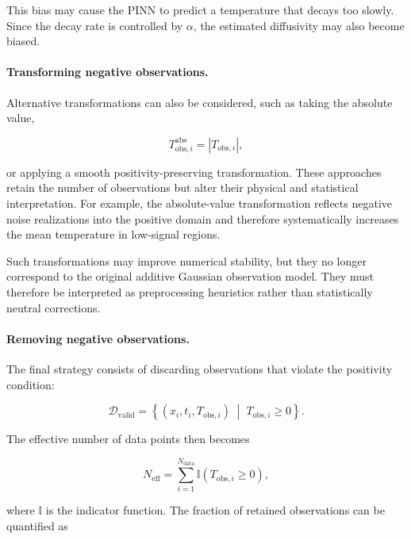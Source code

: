 This bias may cause the PINN to predict a temperature that decays too slowly. Since the decay rate is controlled by $\alpha$, the estimated diffusivity may also become biased.

\paragraph{Transforming negative observations.}

Alternative transformations can also be considered, such as taking the absolute value,

\begin{equation}
T_{\mathrm{obs},i}^{\mathrm{abs}}
=
\left|T_{\mathrm{obs},i}\right|,
\end{equation}

or applying a smooth positivity-preserving transformation. These approaches retain the number of observations but alter their physical and statistical interpretation. For example, the absolute-value transformation reflects negative noise realizations into the positive domain and therefore systematically increases the mean temperature in low-signal regions.

Such transformations may improve numerical stability, but they no longer correspond to the original additive Gaussian observation model. They must therefore be interpreted as preprocessing heuristics rather than statistically neutral corrections.

\paragraph{Removing negative observations.}

The final strategy consists of discarding observations that violate the positivity condition:

\begin{equation}
\mathcal{D}_{\mathrm{valid}}
=
\left\{
(x_i,t_i,T_{\mathrm{obs},i})
\; \middle| \;
T_{\mathrm{obs},i}\geq 0
\right\}.
\end{equation}

The effective number of data points then becomes

\begin{equation}
N_{\mathrm{eff}}
=
\sum_{i=1}^{N_{\mathrm{data}}}
\mathbb{I}
\left(
T_{\mathrm{obs},i}\geq 0
\right),
\end{equation}

where $\mathbb{I}$ is the indicator function. The fraction of retained observations can be quantified as

